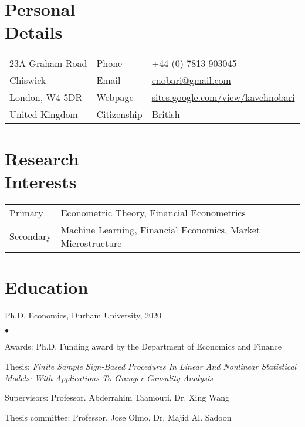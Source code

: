\documentclass[margin,line,pifont,palatino,courier]{res}
\newenvironment{list2}{
  \begin{list}{$\bullet$}{%
      \setlength{\itemsep}{0in}
      \setlength{\parsep}{0in} \setlength{\parskip}{0in}
      \setlength{\topsep}{0in} \setlength{\partopsep}{0in}
      \setlength{\leftmargin}{0.2in}}}{\end{list}}
\begin{document}

\begin{resume}

\section{\sc \bf Personal\\ Details}

\vspace{.05in}

\begin{tabular}{@{}p{2.0in}p{0.70in}p{3.5in}}
23A Graham Road & Phone &+44 (0) 7813 903045 \\
Chiswick                        &Email &\href{mailto: cnobari@gmail.com}{cnobari@gmail.com}\\
London, W4 5DR      &Webpage &\href{https://sites.google.com/view/kavehnobari}{sites.google.com/view/kavehnobari}\\
United Kingdom      & Citizenship &British\\
\end{tabular}

\hrulefill
\section{\sc \bf Research\\ Interests}
\begin{tabular}{@{}p{0.65in}p{5in}}
Primary & Econometric Theory, Financial Econometrics \\
\rule{0pt}{4ex}Secondary      &Machine Learning, Financial Economics, Market Microstructure  \\
\end{tabular}

\hrulefill

\section{\sc \bf Education}

Ph.D. Economics, Durham University, 2020
\vspace*{+4ex}
\begin{list2}
\item Awards: Ph.D. Funding award by the Department of Economics and Finance
\item Thesis: \emph{Finite Sample Sign-Based Procedures In Linear And Nonlinear Statistical Models: With Applications To Granger Causality Analysis}
\item Supervisors: Professor. Abderrahim Taamouti, Dr. Xing Wang
\item Thesis committee: Professor. Jose Olmo, Dr. Majid Al. Sadoon
\end{list2}


\end{resume}
\end{document}
